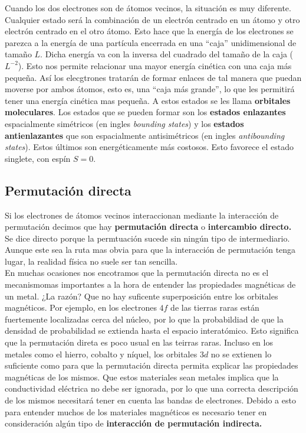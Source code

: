 \documentclass[12pt,a4paper]{book}
\numberwithin{equation}{section}
\numberwithin{figure}{section}
\begin{document}
Cuando los dos electrones son de átomos vecinos, la situación es muy diferente. Cualquier estado será la combinación de un electrón centrado en un átomo y otro electrón centrado en el otro átomo. Esto hace que la energía de los electrones se parezca a la energía de una partícula encerrada en una ``caja'' unidimensional de tamaño $L$. Dicha energía va con la inversa del cuadrado del tamaño de la caja ($L^{-2}$). Esto nos permite relacionar una mayor energía cinética con una caja más pequeña. Así los elecgtrones tratarán de formar enlaces de tal manera que puedan moverse por ambos átomos, esto es, una ``caja más grande'', lo que les permitirá tener una energía cinética mas pequeña. A estos estados se les llama \textbf{orbitales moleculares}. Los estados que se pueden formar son los \textbf{estados enlazantes} espacialmente simétricos (en ingles \textit{bounding states}) y los \textbf{estados antienlazantes} que son espacialmente antisimétricos (en ingles \textit{antibounding states}). Estos últimos son energéticamente más costosos. Esto favorece el estado singlete, con espín $S=0$.

\subsection{Permutación directa}

Si los electrones de átomos vecinos interaccionan mediante la interacción de permutación decimos que hay \textbf{permutación directa} o \textbf{intercambio directo.} Se dice directo porque la permtuación sucede sin ningún tipo de intermediario. Aunque este sea la ruta mas obvia para que la interacción de permutación tenga lugar, la realidad física no suele ser tan sencilla. \\

En muchas ocasiones nos encotramos que la permutación directa no es el mecanismomas importantes a la hora de entender las propiedades magnéticas de un metal. ¿La razón? Que no hay suficente superposición entre los orbitales magnéticos. Por ejemplo, en los electrones $4f$ de las tierras raras están fuertemente localizadas cerca del núcleo, por lo que la probabildiad de que la densidad de probabilidad se extienda hasta el espacio interatómico. Esto significa que la permutación direta es poco usual en las teirras raras. Incluso en los metales como el hierro, cobalto y níquel, los orbitales $3d$ no se extienen lo suficiente como para que la permutación directa permita explicar las propiedades magnéticas de los mismos. Que estos materiales sean metales implica que la conductividad eléctrica no debe ser ignorada, por lo que una correcta descripción de los mismos necesitará tener en cuenta las bandas de electrones. Debido a esto para entender muchos de los materiales magnéticos es necesario tener en consideración algún tipo de \textbf{interacción de permutación indirecta.}
\end{document}
